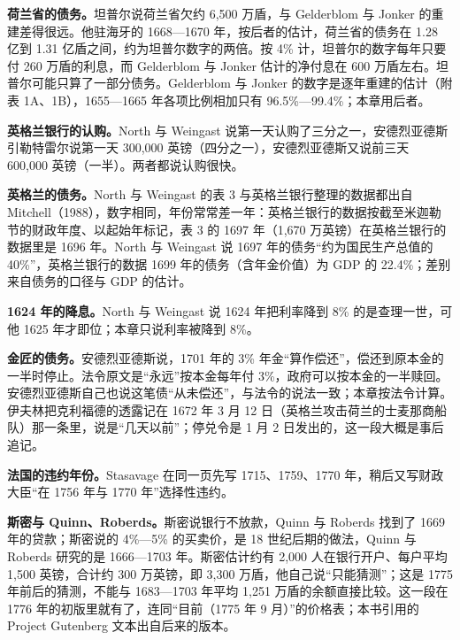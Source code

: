 \begin{deeper}[史料与几处不一致]
\textbf{荷兰省的债务。}坦普尔说荷兰省欠约 6,500 万盾，与 Gelderblom 与 Jonker 的重建差得很远。他驻海牙的 1668—1670 年，按后者的估计，荷兰省的债务在 1.28 亿到 1.31 亿盾之间，约为坦普尔数字的两倍。按 4\% 计，坦普尔的数字每年只要付 260 万盾的利息，而 Gelderblom 与 Jonker 估计的净付息在 600 万盾左右\cite{temple1673,gj2011}。坦普尔可能只算了一部分债务。Gelderblom 与 Jonker 的数字是逐年重建的估计（附表 1A、1B），1655—1665 年各项比例相加只有 96.5\%—99.4\%；本章用后者。

\textbf{英格兰银行的认购。}North 与 Weingast 说第一天认购了三分之一，安德烈亚德斯引勒特雷尔说第一天 300,000 英镑（四分之一），安德烈亚德斯又说前三天 600,000 英镑（一半）。两者都说认购很快。

\textbf{英格兰的债务。}North 与 Weingast 的表 3 与英格兰银行整理的数据都出自 Mitchell（1988），数字相同，年份常常差一年：英格兰银行的数据按截至米迦勒节的财政年度、以起始年标记，表 3 的 1697 年（1,670 万英镑）在英格兰银行的数据里是 1696 年。North 与 Weingast 说 1697 年的债务“约为国民生产总值的 40\%”，英格兰银行的数据 1699 年的债务（含年金价值）为 GDP 的 22.4\%；差别来自债务的口径与 GDP 的估计。

\textbf{1624 年的降息。}North 与 Weingast 说 1624 年把利率降到 8\% 的是查理一世，可他 1625 年才即位；本章只说利率被降到 8\%。

\textbf{金匠的债务。}安德烈亚德斯说，1701 年的 3\% 年金“算作偿还”，偿还到原本金的一半时停止。法令原文是“永远”按本金每年付 3\%，政府可以按本金的一半赎回\cite{statutes1701}。安德烈亚德斯自己也说这笔债“从未偿还”，与法令的说法一致；本章按法令计算。伊夫林把克利福德的透露记在 1672 年 3 月 12 日（英格兰攻击荷兰的士麦那商船队）那一条里，说是“几天以前”\cite{evelyn1901}；停兑令是 1 月 2 日发出的，这一段大概是事后追记。

\textbf{法国的违约年份。}Stasavage 在同一页先写 1715、1759、1770 年，稍后又写财政大臣“在 1756 年与 1770 年”选择性违约\cite{stasavage2002}。

\textbf{斯密与 Quinn、Roberds。}斯密说银行不放款，Quinn 与 Roberds 找到了 1669 年的贷款；斯密说的 4\%—5\% 的买卖价，是 18 世纪后期的做法，Quinn 与 Roberds 研究的是 1666—1703 年。斯密估计约有 2,000 人在银行开户、每户平均 1,500 英镑，合计约 300 万英镑，即 3,300 万盾，他自己说“只能猜测”\cite{smith1776}；这是 1775 年前后的猜测，不能与 1683—1703 年平均 1,251 万盾的余额直接比较。这一段在 1776 年的初版里就有了，连同“目前（1775 年 9 月）”的价格表\cite{smith1776}；本书引用的 Project Gutenberg 文本出自后来的版本。
\end{deeper}

